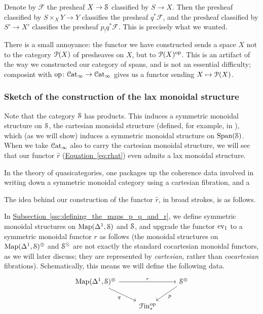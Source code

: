 \documentclass[main.tex]{subfiles}
\begin{document}
Denote by $\mathcal{F}$ the presheaf $X \to \S$ classified by $S \to X$. Then the presheaf classified by $S \times_{X} Y \to Y$ classifies the presheaf $q^{*}\mathcal{F}$, and the presheaf classified by $S' \to X'$ classifies the presheaf $p_{!}q^{*}\mathcal{F}$. This is precisely what we wanted.

There is a small annoyance: the functor we have constructed sends a space $X$ not to the category $\P(X)$ of presheaves on $X$, but to $\P(X)\op$. This is an artifact of the way we constructed our category of spans, and is not an essential difficulty; composint with $\mathrm{op}\colon \ICat \to \ICat$ gives us a functor sending $X \mapsto \P(X)$.

\subsubsection{Sketch of the construction of the lax monoidal structure}
\label{sss:sketch_of_lax_monoidal_structure}

Note that the category $\S$ has products. This induces a symmetric monoidal structure on $\S$, the cartesian monoidal structure (defined, for example, in \cite[Sec.~2.4.1]{luriehigheralgebra}), which (as we will show) induces a symmetric monoidal structure on $\Span(\S)$. When we take $\Cat_{\infty}$ also to carry the cartesian monoidal structure, we will see that our functor $\hat{r}$ (\hyperref[eq:rhat]{Equation~\ref*{eq:rhat}}) even admits a lax monoidal structure.

In the theory of quasicategories, one packages up the coherence data involved in writing down a symmetric monoidal category using a cartesian fibration, and a

The idea behind our construction of the functor $\hat{r}$, in broad strokes, is as follows.

In \hyperref[ssc:defining_the_maps_p_q_and_r]{Subsection~\ref*{ssc:defining_the_maps_p_q_and_r}}, we define symmetric monoidal structures on $\Map(\Delta^{1}, \S)$ and $\S$, and upgrade the functor $\ev_{1}$ to a symmetric monoidal functor $r$ as follows (the monoidal structures on $\Map(\Delta^{1}, \S)^{\otimes}$ and $\S^{\otimes}$ are not exactly the standard cocartesian monoidal functors, as we will later discuss; they are represented by \emph{cartesian,} rather than \emph{cocartesian} fibrations). Schematically, this means we will define the following data.
\begin{equation}
  \label{eq:wishlist_prq}
  \begin{tikzcd}
    \Map(\Delta^{1}, \S)^{\otimes}
    \arrow[rr, "r"]
    \arrow[dr, swap, "q"]
    && \S^{\otimes}
    \arrow[dl, "p"]
    \\
    & \Finp\op
  \end{tikzcd}
\end{equation}
\end{document}
